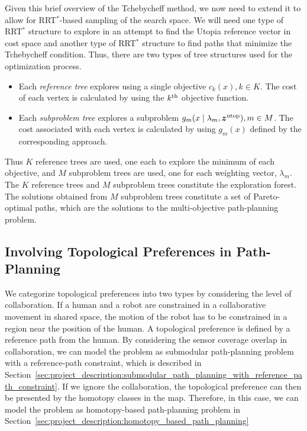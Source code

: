 \documentclass[phd]{byuprop}
\begin{document}
Given this brief overview of the Tchebycheff method, we now need to extend it to allow for RRT$^{*}$-based sampling of the search space.  
We will need one type of RRT$^{*}$ structure to explore in an attempt to find the Utopia reference vector in cost space and another type of RRT$^{*}$ structure to find paths that minimize the Tchebycheff condition. %
Thus, there are two types of tree structures used for the optimization process.
\begin{itemize}
	\item Each \emph{reference tree} explores using a single objective $ c_{k} (x), k \in K $. 
	The cost of each vertex is calculated by using the $ k^{\rm th} $ objective function.
	\item Each \emph{subproblem tree} explores a subproblem $ g_{m} ( x \mid \lambda_{m} , \bm{z}^{\rm utop} ) , m \in M $.
	The cost associated with each vertex is calculated by using $ g_{m}(x) $ defined by the corresponding approach.
\end{itemize}
Thus $ K $ reference trees are used, one each to explore the minimum of each objective, and $ M $ subproblem trees are used, one for each weighting vector, $ \lambda_{m} $.  
The $K$ reference trees and $M$ subproblem trees constitute the exploration forest.
The solutions obtained from $ M $ subproblem trees constitute a set of Pareto-optimal paths, which are the solutions to the multi-objective path-planning problem. 

\subsection{Involving Topological Preferences in Path-Planning}
\label{sec:project_description:involving_topological_preferences_in_path_planning}

We categorize topological preferences into two types by considering the level of collaboration.
If a human and a robot are constrained in a collaborative movement in shared space, the motion of the robot has to be constrained in a region near the position of the human.
A topological preference is defined by a reference path from the human.
By considering the sensor coverage overlap in collaboration, we can model the problem as submodular path-planning problem with a reference-path constraint, which is described in Section~\ref{sec:project_description:submodular_path_planning_with_reference_path_constraint}.
If we ignore the collaboration, the topological preference can then be presented by the homotopy classes in the map.
Therefore, in this case, we can model the problem as homotopy-based path-planning problem in Section~\ref{sec:project_description:homotopy_based_path_planning} 
\end{document}
